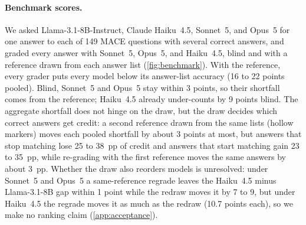 \documentclass{article}
\begin{document}
\paragraph{Benchmark scores.}
We asked Llama-3.1-8B-Instruct, Claude Haiku~4.5, Sonnet~5, and Opus~5 for one answer to each of 149 \textsc{MACE} questions with several correct answers, and graded every answer with Sonnet~5, Opus~5, and Haiku~4.5, blind and with a reference drawn from each answer list (\cref{fig:benchmark}). With the reference, every grader puts every model below its answer-list accuracy (16 to 22 points pooled). Blind, Sonnet~5 and Opus~5 stay within 3 points, so their shortfall comes from the reference; Haiku~4.5 already under-counts by 9 points blind. The aggregate shortfall does not hinge on the draw, but the draw decides which correct answers get credit: a second reference drawn from the same lists (hollow markers) moves each pooled shortfall by about 3 points at most, but answers that stop matching lose 25 to 38~pp of credit and answers that start matching gain 23 to 35~pp, while re-grading with the first reference moves the same answers by about 3~pp. Whether the draw also reorders models is unresolved: under Sonnet~5 and Opus~5 a same-reference regrade leaves the Haiku~4.5 minus Llama-3.1-8B gap within 1 point while the redraw moves it by 7 to 9, but under Haiku~4.5 the regrade moves it as much as the redraw (10.7 points each), so we make no ranking claim (\cref{app:acceptance}).
\end{document}
